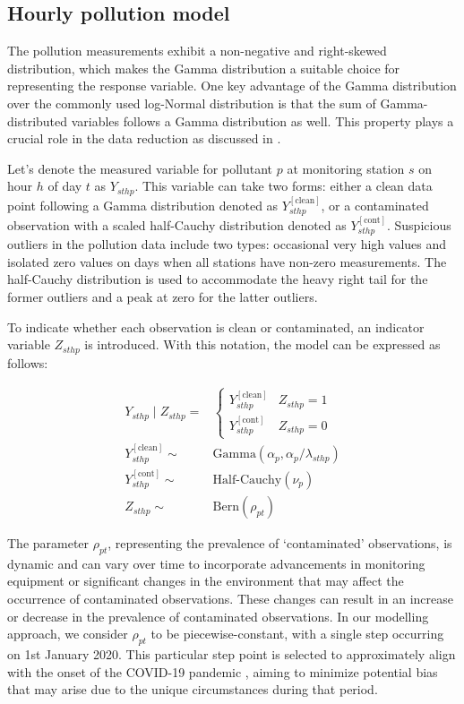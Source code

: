 \documentclass[
  12,
]{article}
\begin{document}
\hypertarget{hourly-pollution-model}{%
\subsection{Hourly pollution model}\label{hourly-pollution-model}}

The pollution measurements exhibit a non-negative and right-skewed
distribution, which makes the Gamma distribution a suitable choice for
representing the response variable. One key advantage of the Gamma
distribution over the commonly used log-Normal distribution is that the
sum of Gamma-distributed variables follows a Gamma distribution as well.
This property plays a crucial role in the data reduction as discussed in
\textcite{Huang2022}.

Let's denote the measured variable for pollutant \(p\) at monitoring
station \(s\) on hour \(h\) of day \(t\) as \(Y_{sthp}\). This variable
can take two forms: either a clean data point following a Gamma
distribution denoted as \(Y_{sthp}^{[\mbox{clean}]}\), or a contaminated
observation with a scaled half-Cauchy distribution denoted as
\(Y_{sthp}^{[\mbox{cont}]}\). Suspicious outliers in the pollution data
include two types: occasional very high values and isolated zero values
on days when all stations have non-zero measurements. The half-Cauchy
distribution is used to accommodate the heavy right tail for the former
outliers and a peak at zero for the latter outliers.

To indicate whether each observation is clean or contaminated, an
indicator variable \(Z_{sthp}\) is introduced. With this notation, the
model can be expressed as follows:

\begin{equation}\label{eqnPollutionhour}
\begin{aligned}
Y_{sthp} \mid Z_{sthp}  = & 
\begin{cases}
Y_{sthp}^{[\mbox{clean}]} &  Z_{sthp} =1 \\ 
Y_{sthp}^{[\mbox{cont}]} & Z_{sthp}=0
\end{cases} \\
Y_{sthp}^{[\mbox{clean}]} \sim & \mbox{Gamma}
\left( \alpha_p, \alpha_p / \lambda_{sthp} \right) \\
Y_{sthp}^{[\mbox{cont}]} \sim & \mbox{Half-Cauchy}(\nu_{p})\\
Z_{sthp} \sim & \mbox{Bern}(\rho_{pt})
\end{aligned}
\end{equation}

The parameter \(\rho_{pt}\), representing the prevalence of
`contaminated' observations, is dynamic and can vary over time to
incorporate advancements in monitoring equipment or significant changes
in the environment that may affect the occurrence of contaminated
observations. These changes can result in an increase or decrease in the
prevalence of contaminated observations. In our modelling approach, we
consider \(\rho_{pt}\) to be piecewise-constant, with a single step
occurring on 1st January 2020. This particular step point is selected to
approximately align with the onset of the COVID-19 pandemic
\autocite{who_timeline}, aiming to minimize potential bias that may
arise due to the unique circumstances during that period.
\end{document}
